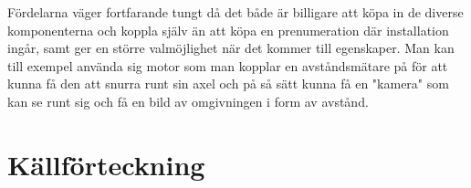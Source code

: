 \documentclass{article}
\begin{document}
Fördelarna väger fortfarande tungt då det både är billigare att köpa in de diverse komponenterna och koppla själv än att köpa en prenumeration där installation ingår, 
samt ger en större valmöjlighet när det kommer till egenskaper. 
Man kan till exempel använda sig motor som man kopplar en avståndsmätare på för att kunna få den att snurra runt sin axel och på så sätt kunna få en "kamera" som kan se runt sig och få en bild av omgivningen i form av avstånd.

\newpage
\section{Källförteckning}
\printbibliography[heading=none]
\end{document}
